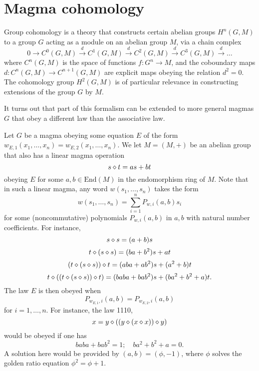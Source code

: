 \chapter{Magma cohomology}\label{cohomology-chapter}

Group cohomology is a theory that constructs certain abelian groups $H^n(G,M)$ to a group $G$ acting as a module on an abelian group $M$, via a chain complex
$$ 0 \to C^0(G,M) \stackrel{d}{\to} C^1(G,M) \stackrel{d}{\to} C^2(G,M) \stackrel{d}{\to} C^3(G,M) \stackrel{d}{\to} \dots$$
where $C^n(G,M)$ is the space of functions $f: G^n \to M$, and the coboundary maps $d: C^n(G,M) \to C^{n+1}(G,M)$ are explicit maps obeying the relation $d^2=0$.  The cohomology group $H^2(G,M)$ is of particular relevance in constructing extensions of the group $G$ by $M$.

It turns out that part of this formalism can be extended to more general magmas $G$ that obey a different law than the associative law.

Let $G$ be a magma obeying some equation $E$ of the form $w_{E,1}(x_1,\dots,x_n) = w_{E,2}(x_1,\dots,x_n)$.  We let $M = (M,+)$ be an abelian group that also has a linear magma operation
$$ s \diamond t = as + bt$$
obeying $E$ for some $a,b \in \mathrm{End}(M)$ in the endomorphism ring of $M$.    Note that in such a linear magma, any word $w(s_1,\dots,s_n)$ takes the form
$$ w(s_1,\dots,s_n) = \sum_{i=1}^n P_{w,i}(a,b) s_i$$
for some (noncommutative) polynomials $P_{w,i}(a,b)$ in $a,b$ with natural number coefficients.  For instance,
$$ s \diamond s = (a+b) s$$
$$ t \diamond (s \diamond s) = (ba+b^2) s + at$$
$$ (t \diamond (s \diamond s)) \diamond t = (aba+ab^2) s + (a^2+b)t$$
$$ t \diamond ((t \diamond (s \diamond s)) \diamond t) = (baba+bab^2) s + (ba^2+b^2+a)t.$$
The law $E$ is then obeyed when
$$ P_{w_{E,1},i}(a,b)= P_{w_{E,2},i}(a,b)$$
for $i=1,\dots,n$.  For instance, the law 1110,
\begin{equation}\label{1110}
  x = y \diamond ((y \diamond (x \diamond x)) \diamond y)
\end{equation}
would be obeyed if one has
\begin{equation}\label{baba}
 baba+bab^2 = 1; \quad ba^2+b^2+a = 0.
\end{equation}
A solution here would be provided by $(a,b) = (\phi,-1)$, where $\phi$ solves the golden ratio equation $\phi^2 = \phi + 1$.

